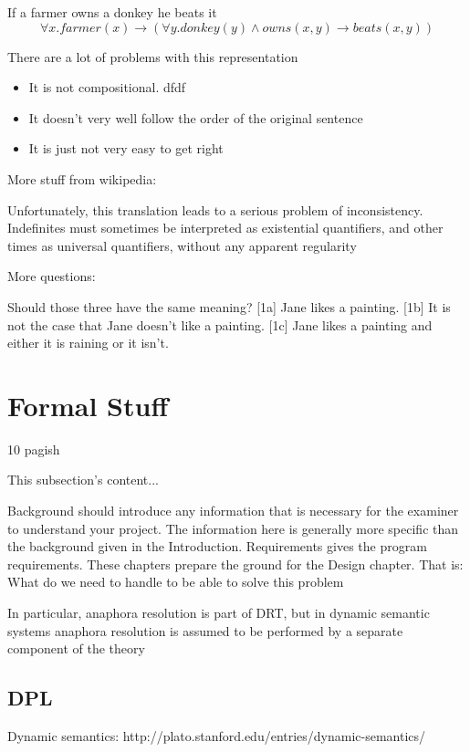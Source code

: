 \documentclass[12pt]{article}
\let\stdsection\section
\renewcommand\section{\newpage\stdsection}
\begin{document}
If a farmer owns a donkey he beats it
\begin{equation}
\forall x . farmer(x) \rightarrow (\forall y . donkey(y) \wedge owns(x,y) \rightarrow beats(x,y))
\end{equation}

There are a lot of problems with this representation
\begin{itemize}
  \item It is not compositional. 
  dfdf
  \item It doesn't very well follow the order of the original sentence
  \item It is just not very easy to get right
\end{itemize}

More stuff from wikipedia:

Unfortunately, this translation leads to a serious problem of inconsistency. Indefinites must sometimes be interpreted as existential quantifiers, and other times as universal quantifiers, without any apparent regularity

More questions:

Should those three have the same meaning?
[1a]  Jane likes a painting.
[1b]  It is not the case that Jane doesn't like a painting.
[1c]  Jane likes a painting and either it is raining or it isn't.


\section{Formal Stuff}
10 pagish

This subsection's content...

Background should introduce any information that is necessary for the examiner to understand your project. 
The information here is generally more specific than the background given in the Introduction.
Requirements gives the program requirements. These chapters prepare the ground for the Design chapter.
That is: What do we need to handle to be able to solve this problem

In particular, anaphora resolution is part of DRT, but in dynamic semantic systems anaphora resolution is assumed to be performed by a separate component of the theory

\subsection{DPL}
Dynamic semantics: http://plato.stanford.edu/entries/dynamic-semantics/
\end{document}
